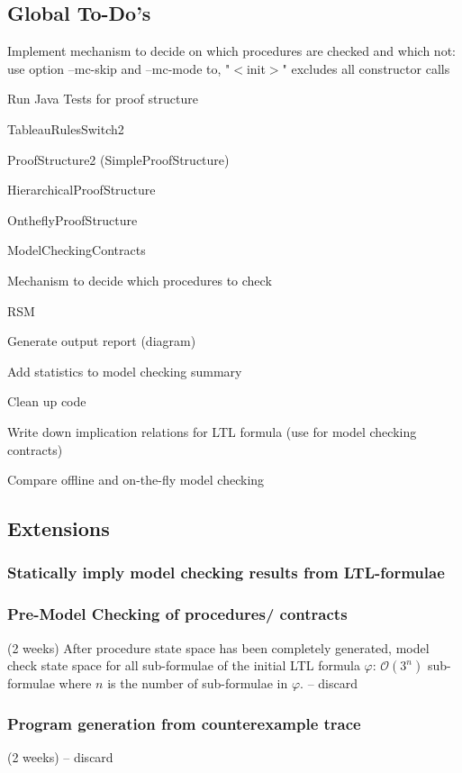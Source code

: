 \documentclass[a4paper,12pt]{article}
\newcommand{\cmark}{\ding{51}}%
\newcommand{\xmark}{\ding{55}}%
\newcommand{\done}{\rlap{$\square$}{\raisebox{2pt}{\large\hspace{1pt}\cmark}}%
\hspace{-2.5pt}}
\newcommand{\wontfix}{\rlap{$\square$}{\large\hspace{1pt}\xmark}}
\begin{document}
\subsection{Global To-Do's}
\begin{todolist}
	\item[\done] Implement mechanism to decide on which procedures are checked and which not: use option --mc-skip and --mc-mode to, "$<$init$>$" excludes all constructor calls
	\item Run Java Tests for proof structure
		\begin{todolist}
			\item[\done] TableauRulesSwitch2
			\item[\done] ProofStructure2 (SimpleProofStructure)
			\item HierarchicalProofStructure
			\item OntheflyProofStructure
			\item ModelCheckingContracts
			\item Mechanism to decide which procedures to check
			\item RSM
		\end{todolist}
	\item Generate output report (diagram)
	\item Add statistics to model checking summary
	\item Clean up code
	\item[\wontfix] Write down implication relations for LTL formula (use for model checking contracts)
	\item Compare offline and on-the-fly model checking
\end{todolist}

\subsection{Extensions}	
\subsubsection{Statically imply model checking results from LTL-formulae}
\subsubsection{Pre-Model Checking of procedures/ contracts}
(2 weeks)
After procedure state space has been completely generated, model check state space for all sub-formulae of the initial LTL formula  $\varphi$: $\mathcal{O}(3^n)$ sub-formulae where $n$ is the number of sub-formulae in $\varphi$.	
-- discard

\subsubsection{Program generation from counterexample trace}
(2 weeks)
-- discard
\end{document}
